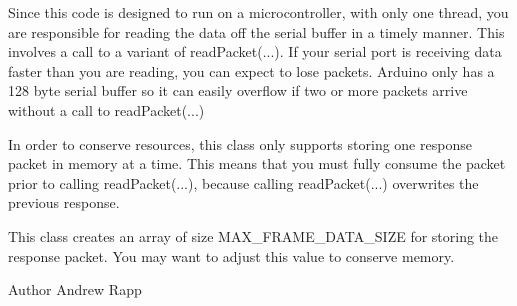 \-Since this code is designed to run on a microcontroller, with only one thread, you are responsible for reading the data off the serial buffer in a timely manner. \-This involves a call to a variant of read\-Packet(...). \-If your serial port is receiving data faster than you are reading, you can expect to lose packets. \-Arduino only has a 128 byte serial buffer so it can easily overflow if two or more packets arrive without a call to read\-Packet(...) 

\-In order to conserve resources, this class only supports storing one response packet in memory at a time. \-This means that you must fully consume the packet prior to calling read\-Packet(...), because calling read\-Packet(...) overwrites the previous response. 

\-This class creates an array of size \-M\-A\-X\-\_\-\-F\-R\-A\-M\-E\-\_\-\-D\-A\-T\-A\-\_\-\-S\-I\-Z\-E for storing the response packet. \-You may want to adjust this value to conserve memory.

\begin{DoxyAuthor}{\-Author}
\-Andrew \-Rapp 
\end{DoxyAuthor}


